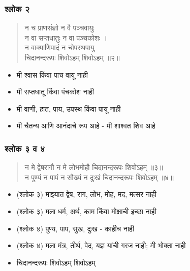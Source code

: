 \begin{frame}[fragile]\frametitle{श्लोक २}

\begin{verse}
न च प्राणसंज्ञो न वै पञ्चवायुः \\
न वा सप्तधातुः न वा पञ्चकोशः । \\
न वाक्पाणिपादं न चोपस्थपायु \\
चिदानन्दरूपः शिवोऽहम् शिवोऽहम् ॥२॥
\end{verse}

	\begin{itemize}
	\item मी श्वास किंवा पाच वायू नाही
	\item मी सप्तधातू किंवा पंचकोश नाही
	\item मी वाणी, हात, पाय, उपस्थ किंवा पायू नाही
	\item मी चैतन्य आणि आनंदाचे रूप आहे - मी शाश्वत शिव आहे
	\end{itemize}

\end{frame}

\begin{frame}[fragile]\frametitle{श्लोक ३ व ४}

\begin{verse}
न मे द्वेषरागौ न मे लोभमोहौ \quad चिदानन्दरूपः शिवोऽहम् ॥३॥ \\
न पुण्यं न पापं न सौख्यं न दुःखं \quad चिदानन्दरूपः शिवोऽहम् ॥४॥
\end{verse}

	\begin{itemize}
	\item (श्लोक ३) माझ्यात द्वेष, राग, लोभ, मोह, मद, मत्सर नाही
	\item (श्लोक ३) मला धर्म, अर्थ, काम किंवा मोक्षाची इच्छा नाही
	\item (श्लोक ४) पुण्य, पाप, सुख, दुःख - काहीच नाही
	\item (श्लोक ४) मला मंत्र, तीर्थ, वेद, यज्ञ यांची गरज नाही; मी भोक्ता नाही
	\item चिदानन्दरूपः शिवोऽहम् शिवोऽहम्
	\end{itemize}

\end{frame}

